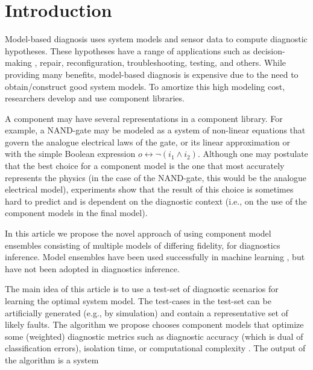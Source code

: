 \section{Introduction}
%
Model-based diagnosis \citep{dekleer87diagnosing} uses system models
and sensor data to compute diagnostic hypotheses. These hypotheses
have a range of applications such as decision-making
\citep{feldman13genius}, repair, reconfiguration, troubleshooting,
testing, and others. While providing many benefits, model-based
diagnosis is expensive due to the need to obtain/construct good system
models. To amortize this high modeling cost, researchers develop and
use component libraries.
\par
A component may have several representations in a component
library. For example, a NAND-gate may be modeled as a system of
non-linear equations that govern the analogue electrical laws of the
gate, or its linear approximation or with the simple Boolean
expression $o \leftrightarrow \neg(i_1 \wedge i_2)$. Although one may
postulate that the best choice for a component model is the one that
most accurately represents the physics (in the case of the NAND-gate,
this would be the analogue electrical model), experiments show that
the result of this choice is sometimes hard to predict and is
dependent on the diagnostic context (i.e., on the use of the component
models in the final model).
\par
In this article we propose the novel approach of using component model
ensembles consisting of multiple models of differing fidelity, for
diagnostics inference. Model ensembles have been used successfully in
machine learning \citep{brown2010ensemble,dietterich2000ensemble}, but
have not been adopted in diagnostics inference.
\par
The main idea of this article is to use a test-set of diagnostic
scenarios for learning the optimal system model. The test-cases in the
test-set can be artificially generated (e.g., by simulation) and
contain a representative set of likely faults. The algorithm we
propose chooses component models that optimize some (weighted)
diagnostic metrics such as diagnostic accuracy (which is dual of
classification errors), isolation time, or computational complexity
\citep{feldman10empirical}. The output of the algorithm is a system
